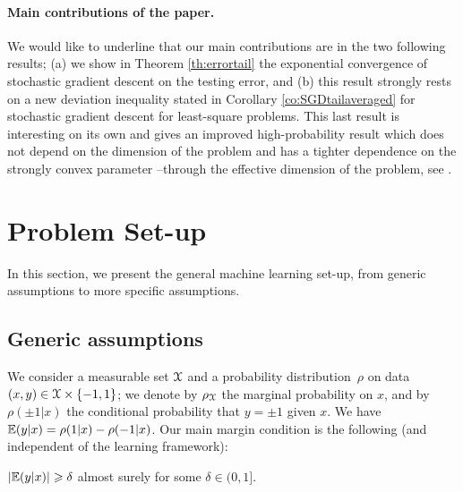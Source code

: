 \documentclass[final]{colt2018} %
\begin{document}
\paragraph{Main contributions of the paper.} We would like to underline that our main contributions are in the two following results; (a) we show in Theorem \ref{th:errortail} the exponential convergence of stochastic gradient descent on the testing error, and (b) this result strongly rests on a new deviation inequality stated in Corollary \ref{co:SGDtailaveraged} for stochastic gradient descent for least-square problems. This last result is interesting on its own and gives an improved high-probability result which does not depend on the dimension of the problem and has a tighter dependence on the strongly convex parameter --through the effective dimension of the problem, see \citet{caponnetto2007optimal,dieuleveut2016nonparametric}.


\section{Problem Set-up}
\label{sec:setup}


In this section, we present the general machine learning set-up, from generic assumptions to more specific assumptions.

\subsection{Generic assumptions}

We consider a measurable set ${\mathcal X}$  and a probability distribution~$\rho$ on data $(x,y) \in {\mathcal X} \times \{-1,1\}$; we denote by ${\rho_{{\mathcal X}}}$ the marginal probability on $x$, and by $\rho(\pm 1|x)$ the conditional probability that $y=\pm1$ given $x$. We have ${\mathbb E}(y | x) = \rho(1|x) - \rho(-1|x)$. Our main margin condition is the following (and independent of the learning framework):

\bas\label{asm:separability} 
$ | {\mathbb E} (y | x) | \geqslant \delta$ almost surely for some $\delta \in (0,1]$.
\eas
\end{document}
